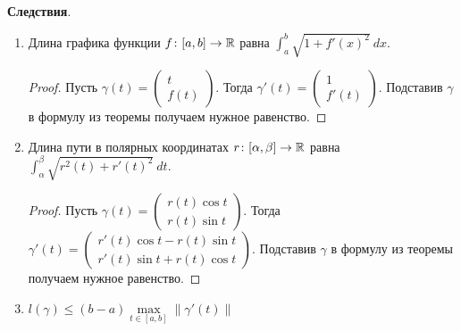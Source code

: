   \textbf{Следствия}.
  \begin{enumerate}
    \item Длина графика функции $f\colon [a, b] \to \mathbb{R}$ равна $\int_{a}^{b} \sqrt{1 + f'(x)^2} \: dx$.
    \begin{proof}
      Пусть
      $
      \gamma(t) =
      \begin{pmatrix}
        t\\
        f(t)
      \end{pmatrix}
      $. Тогда
      $
      \gamma'(t) =
      \begin{pmatrix}
        1\\
        f'(t)
      \end{pmatrix}
      $. Подставив $\gamma$ в формулу из теоремы получаем нужное равенство.
    \end{proof}
    \item Длина пути в полярных координатах $r\colon [\alpha, \beta] \to \mathbb{R}$ равна $\int_{\alpha}^{\beta} \sqrt{r^2(t) + r'(t)^2} \: dt$.
    \begin{proof}
      Пусть
      $
      \gamma(t) =
      \begin{pmatrix}
        r(t)\cos t \\
        r(t)\sin t
      \end{pmatrix}
      $. Тогда
      $
      \gamma'(t) =
      \begin{pmatrix}
        r'(t)\cos t - r(t)\sin t \\
        r'(t)\sin t + r(t)\cos t
      \end{pmatrix}
      $. Подставив $\gamma$ в формулу из теоремы получаем нужное равенство.
    \end{proof}
    \item $l(\gamma) \leq (b - a)\max\limits_{t \in [a, b]} \| \gamma'(t) \|$
  \end{enumerate}
  